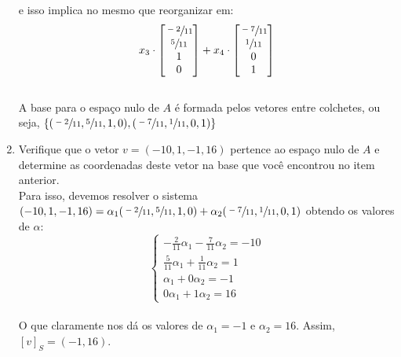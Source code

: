 \begin{enumerate}
          e isso implica no mesmo que reorganizar em:
          \\

          \[
              x_3 \cdot
              \begin{bmatrix}
                  \sfrac{-2}{11} \\
                  \sfrac{5}{11}  \\
                  1              \\
                  0
              \end{bmatrix} +
              x_4 \cdot
              \begin{bmatrix}
                  \sfrac{-7}{11} \\
                  \sfrac{1}{11}  \\
                  0              \\
                  1
              \end{bmatrix}
          \]
          \\

          A base para o espaço nulo de $A$ é formada pelos vetores entre colchetes, ou seja, $\{(\sfrac{-2}{11}, \sfrac{5}{11},1,0),(\sfrac{-7}{11},\sfrac{1}{11},0,1)\}$\\

    \item Verifique que o vetor $v = (-10, 1, -1, 16)$ pertence ao espaço nulo de $A$ e determine as coordenadas deste vetor na base que você encontrou no item anterior.
          \\

          Para isso, devemos resolver o sistema $(-10, 1, -1, 16) =\alpha_1(\sfrac{-2}{11}, \sfrac{5}{11},1,0)+\alpha_2(\sfrac{-7}{11},\sfrac{1}{11},0,1) $ obtendo os valores de $\alpha$:
          \\

          \[
              \begin{cases}
                  -\frac{2}{11}\alpha_1 - \frac{7}{11}\alpha_2 = -10 \\
                  \frac{5}{11}\alpha_1 + \frac{1}{11}\alpha_2 = 1    \\
                  \alpha_1 + 0\alpha_2 = -1                          \\
                  0\alpha_1 + 1\alpha_2 = 16
              \end{cases}
          \]
          \\

          O que claramente nos dá os valores de $\alpha_1=-1$ e $\alpha_2=16$. Assim, $[v]_S=(-1,16)$.
\end{enumerate}

